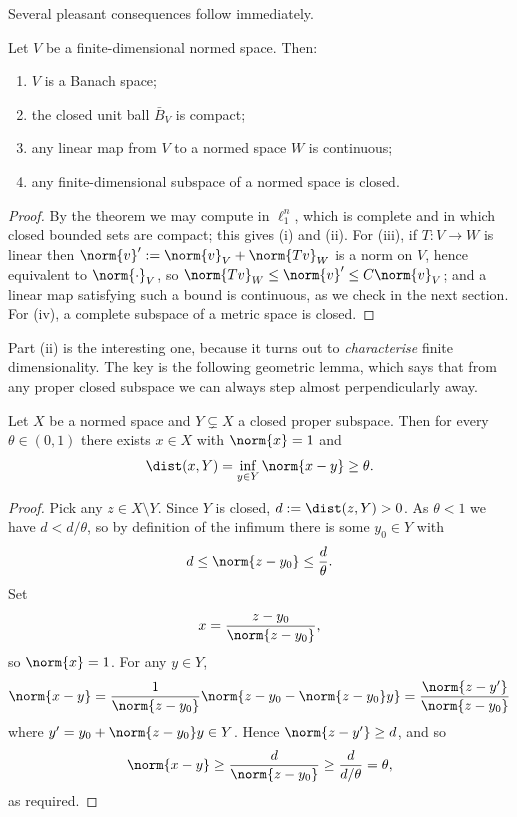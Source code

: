 Several pleasant consequences follow immediately.

\begin{corollary}
	Let $V$ be a finite-dimensional normed space. Then:
	\begin{enumerate}[label=(\roman*)]
		\item $V$ is a Banach space;
		\item the closed unit ball $\bar{B}_V$ is compact;
		\item any linear map from $V$ to a normed space $W$ is continuous;
		\item any finite-dimensional subspace of a normed space is closed.
	\end{enumerate}
\end{corollary}

\begin{proof}
	By the theorem we may compute in $\ell_1^n$, which is complete and in which closed bounded sets are compact; this gives (i) and (ii). For (iii), if $T : V \to W$ is linear then $\norm{v}' := \norm{v}_V + \norm{Tv}_W$ is a norm on $V$, hence equivalent to $\norm{\cdot}_V$, so $\norm{Tv}_W \leq \norm{v}' \leq C \norm{v}_V$; and a linear map satisfying such a bound is continuous, as we check in the next section. For (iv), a complete subspace of a metric space is closed.
\end{proof}

Part (ii) is the interesting one, because it turns out to \emph{characterise} finite dimensionality. The key is the following geometric lemma, which says that from any proper closed subspace we can always step almost perpendicularly away.

\begin{lemma}
	Let $X$ be a normed space and $Y \subsetneq X$ a closed proper subspace. Then for every $\theta \in (0,1)$ there exists $x \in X$ with $\norm{x} = 1$ and
	$$\dist(x, Y) = \inf_{y \in Y} \norm{x - y} \geq \theta.$$
\end{lemma}

\begin{proof}
	Pick any $z \in X \setminus Y$. Since $Y$ is closed, $d := \dist(z, Y) > 0$. As $\theta < 1$ we have $d < d/\theta$, so by definition of the infimum there is some $y_0 \in Y$ with
	$$d \leq \norm{z - y_0} \leq \frac{d}{\theta}.$$
	Set
	$$x = \frac{z - y_0}{\norm{z - y_0}},$$
	so $\norm{x} = 1$. For any $y \in Y$,
	$$\norm{x - y} = \frac{1}{\norm{z - y_0}} \norm{ z - y_0 - \norm{z - y_0} y } = \frac{\norm{z - y'}}{\norm{z-y_0}}$$
	where $y' = y_0 + \norm{z - y_0}y \in Y$. Hence $\norm{z - y'} \geq d$, and so
	$$\norm{x - y} \geq \frac{d}{\norm{z - y_0}} \geq \frac{d}{d/\theta} = \theta,$$
	as required.
\end{proof}

